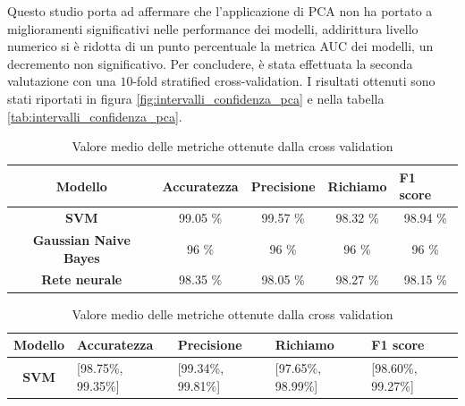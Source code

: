 Questo studio porta ad affermare che l'applicazione di PCA non ha portato a miglioramenti
significativi nelle performance dei modelli, addirittura livello numerico si è ridotta di un
punto percentuale la metrica AUC dei modelli, un decremento non significativo.
\newpage
Per concludere, è stata effettuata la seconda valutazione con una $10$-fold stratified 
cross-validation. I risultati ottenuti sono stati riportati in figura \ref{fig:intervalli_confidenza_pca} e nella
tabella \ref{tab:intervalli_confidenza_pca}.
\begin{table}[!ht]
    \begin{subtable}[h]{1\textwidth}
        \centering
        \begin{tabular}{@{}cllll@{}}
            \toprule
            \rowcolor[HTML]{EFEFEF}
            \textbf{Modello}                                      & \textbf{Accuratezza}         & \textbf{Precisione}          & \textbf{Richiamo}            & \textbf{F1 score}            \\ \midrule
            \cellcolor[HTML]{EFEFEF}\textbf{SVM}                  & \multicolumn{1}{c}{99.05 \%} & \multicolumn{1}{c}{99.57 \%} & \multicolumn{1}{c}{98.32 \%} & \multicolumn{1}{c}{98.94 \%} \\
            \cellcolor[HTML]{EFEFEF}\textbf{Gaussian Naive Bayes} & \multicolumn{1}{c}{96 \%}    & \multicolumn{1}{c}{96 \%}    & \multicolumn{1}{c}{96 \%}    & \multicolumn{1}{c}{96 \%}    \\
            \cellcolor[HTML]{EFEFEF}\textbf{Rete neurale}         & \multicolumn{1}{c}{98.35 \%} & \multicolumn{1}{c}{98.05 \%} & \multicolumn{1}{c}{98.27 \%} & \multicolumn{1}{c}{98.15 \%} \\ \bottomrule
        \end{tabular}
        \caption{Valore medio delle metriche ottenute dalla cross validation}
        \label{tab:risultati_cross_val_pca}
    \end{subtable}
    \hfill
    \begin{subtable}[h]{1\textwidth}
        \centering
        \begin{tabular}{@{}cllll@{}}
            \toprule
            \rowcolor[HTML]{EFEFEF}
            \textbf{Modello}                                      & \textbf{Accuratezza} & \textbf{Precisione} & \textbf{Richiamo}  & \textbf{F1 score}  \\ \midrule
            \cellcolor[HTML]{EFEFEF}\textbf{SVM}                  & [98.75\%, 99.35\%]   & [99.34\%, 99.81\%]  & [97.65\%, 98.99\%] & [98.60\%, 99.27\%] \\

\end{tabular}
\end{subtable}
\end{table}
